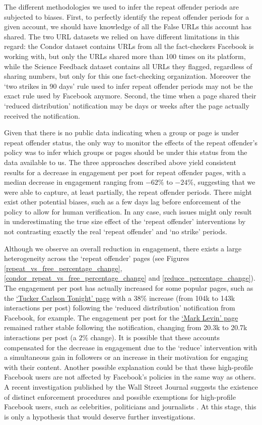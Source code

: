\documentclass[review]{elsarticle}
\begin{document}
{{The different methodologies we used to infer the repeat offender periods are subjected to biases.
First, to perfectly identify the repeat offender periods for a given account, we should have knowledge of all the False URLs this account has shared.
The two URL datasets we relied on have different limitations in this regard: the Condor dataset contains URLs from all the fact-checkers Facebook is working with, but only the URLs shared more than 100 times on its platform, while the Science Feedback dataset contains all URLs they flagged, regardless of sharing numbers, but only for this one fact-checking organization.
Moreover the `two strikes in 90 days' rule used to infer repeat offender periods may not be the exact rule used by Facebook anymore.
Second, the time when a page shared their `reduced distribution' notification may be days or weeks after the page actually received the notification.

Given that there is no public data indicating when a group or page is under repeat offender status, the only way to monitor the effects of the repeat offender's policy was to infer which groups or pages should be under this status from the data available to us.
The three approaches described above yield consistent results for a decrease in engagement per post for repeat offender pages, with a median decrease in engagement ranging from $-62\%$ to $-24\%$, suggesting that we were able to capture, at least partially, the repeat offender periods.
There might exist other potential biases, such as a few days lag before enforcement of the policy to allow for human verification. 
In any case, such issues might only result in underestimating the true size effect of the `repeat offender' interventions by not contrasting exactly the real `repeat offender' and `no strike' periods.

Although we observe an overall reduction in engagement, there exists a large heterogeneity across the `repeat offender' pages (see Figures \ref{repeat_vs_free_percentage_change}, \ref{condor_repeat_vs_free_percentage_change} and \ref{reduce_percentage_change}). 
The engagement per post has actually increased for some popular pages, such as the \href{https://www.facebook.com/TuckerCarlsonTonight/}{`Tucker Carlson Tonight' page} with a $38\%$ increase (from 104k to 143k interactions per post) following the `reduced distribution' notification from Facebook, for example.
The engagement per post for the \href{https://www.facebook.com/marklevinshow}{`Mark Levin' page} remained rather stable following the notification, changing from 20.3k to 20.7k interactions per post (a $2\%$ change).
It is possible that these accounts compensated for the decrease in engagement due to the `reduce' intervention with a simultaneous gain in followers or an increase in their motivation for engaging with their content.
Another possible explanation could be that these high-profile Facebook users are not affected by Facebook's policies in the same way as others. 
A recent investigation published by the Wall Street Journal suggests the existence of distinct enforcement procedures and possible exemptions for high-profile Facebook users, such as celebrities, politicians and journalists \citep{WSJrevelations}. 
At this stage, this is only a hypothesis that would deserve further investigations.

}}
\end{document}
